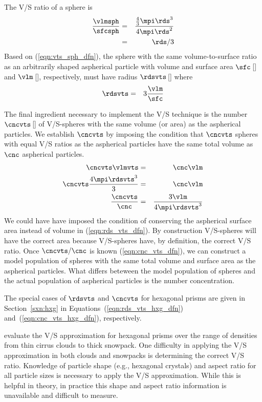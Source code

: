 \documentclass[12pt,twoside]{book}
\begin{document}
The V/S ratio of a sphere is
\begin{eqnarray}
\frac{\vlmsph}{\sfcsph} & = & 
\frac{\frac{4}{3}\mpi\rds^{3}}{4\mpi\rds^{2}} \nonumber \\
& = & \rds/3
\label{eqn:vts_sph_dfn}
\end{eqnarray}
Based on (\ref{eqn:vts_sph_dfn}), the sphere with the same
volume-to-surface ratio as an arbitrarily shaped aspherical particle
with volume and surface area $\sfc$\,[\mS] and $\vlm$\,[\mC],
respectively, must have radius $\rdsvts$\,[\m] where
\begin{eqnarray}
\rdsvts & = & 3\frac{\vlm}{\sfc}
\label{eqn:rds_vts_dfn}
\end{eqnarray}

The final ingredient necessary to implement the V/S technique is 
the number $\cncvts$\,[\nbrxmC] of V/S-spheres with the same volume
(or area) as the aspherical particles.
We establish $\cncvts$ by imposing the condition that
$\cncvts$ spheres with equal V/S ratios as the aspherical particles  
have the same total volume as $\cnc$ aspherical particles.
\begin{eqnarray}
\cncvts \vlmvts & = & \cnc \vlm \\
\cncvts \frac{4\mpi\rdsvts^{3}}{3} & = & \cnc \vlm \nonumber \\
\frac{\cncvts}{\cnc} & = & \frac{3\vlm}{4\mpi\rdsvts^{3}}
\label{eqn:cnc_vts_dfn}
\end{eqnarray}
We could have have imposed the condition of conserving the aspherical
surface area instead of volume in (\ref{eqn:rds_vts_dfn}).
By construction V/S-spheres will have the correct area because
V/S-spheres have, by definition, the correct V/S ratio.  
Once $\cncvts/\cnc$ is known (\ref{eqn:cnc_vts_dfn}), we can construct
a model population of spheres with the same total volume and surface
area as the aspherical particles.  
What differs beteween the model population of spheres and the actual
population of aspherical particles is the number concentration.

The special cases of $\rdsvts$ and $\cncvts$ for hexagonal prisms are 
given in Section~\ref{sxn:hxg} in
Equations~(\ref{eqn:rds_vts_hxg_dfn}) and~(\ref{eqn:cnc_vts_hxg_dfn}),
respectively. 

\cite{NGW03} evaluate the V/S approximation for hexagonal prisms over
the range of densities from thin cirrus clouds to thick snowpack. 
One difficulty in applying the V/S approximation in both clouds and
snowpacks is determining the correct V/S ratio.
Knowledge of particle shape (e.g., hexagonal crystals) and aspect
ratio for all particle sizes is necessary to apply the V/S
approximation. 
While this is helpful in theory, in practice this shape and aspect
ratio information is unavailable and difficult to measure.
\end{document}
